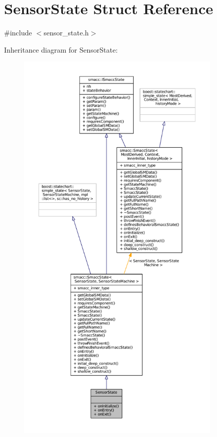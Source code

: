 \hypertarget{structSensorState}{}\section{Sensor\+State Struct Reference}
\label{structSensorState}


{\ttfamily \#include $<$sensor\+\_\+state.\+h$>$}



Inheritance diagram for Sensor\+State\+:
\nopagebreak
\begin{figure}[H]
\begin{center}
\leavevmode
\includegraphics[height=550pt]{structSensorState__inherit__graph}
\end{center}
\end{figure}


